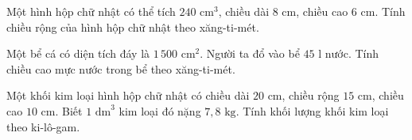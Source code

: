 \begin{ex} %
Một hình hộp chữ nhật có thể tích $240\text{ cm}^3$, chiều dài $8\text{ cm}$, chiều cao $6\text{ cm}$. Tính chiều rộng của hình hộp chữ nhật theo xăng-ti-mét.
\end{ex}

\begin{ex} %
Một bể cá có diện tích đáy là $1\,500\text{ cm}^2$. Người ta đổ vào bể $45\text{ l}$ nước. Tính chiều cao mực nước trong bể theo xăng-ti-mét.
\end{ex}

\begin{ex} %
Một khối kim loại hình hộp chữ nhật có chiều dài $20\text{ cm}$, chiều rộng $15\text{ cm}$, chiều cao $10\text{ cm}$. Biết $1\text{ dm}^3$ kim loại đó nặng $7{,}8\text{ kg}$. Tính khối lượng khối kim loại theo ki-lô-gam.
\end{ex}
